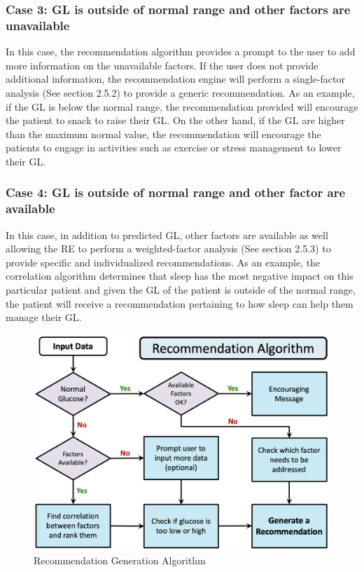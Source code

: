\subsubsection{Case 3: GL is outside of normal range and other factors are unavailable}
In this case, the recommendation algorithm provides a prompt to the user to add more information on the unavailable factors. If the user does not provide additional information, the recommendation engine will perform a single-factor analysis (See section 2.5.2) to provide a generic recommendation. As an example, if the GL is below the normal range, the recommendation provided will encourage the patient to snack to raise their GL. On the other hand, if the GL are higher than the maximum normal value, the recommendation will encourage the patients to engage in activities such as exercise or stress management to lower their GL.

\subsubsection{Case 4: GL is outside of normal range and other factor are available}
In this case, in addition to predicted GL, other factors are available as well allowing the RE to perform a weighted-factor analysis (See section 2.5.3) to provide specific and individualized recommendations. As an example, the correlation algorithm determines that sleep has the most negative impact on this particular patient and given the GL of the patient is outside of the normal range, the patient will receive a recommendation pertaining to how sleep can help them manage their GL.


\begin{figure}[h!]
    \centering
    \includegraphics[scale=0.4]{Figures/pooria/re_alg.png}
    \caption{Recommendation Generation Algorithm}
      \label{fig:re_alg}
\end{figure}


